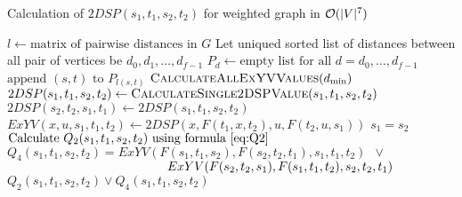 \begin{algorithm}
\caption{Calculation of $2DSP(s_1, t_1, s_2, t_2)$ for weighted graph in $\mathcal{O}(|V|^7)$} \label{alg:n7w}
\begin{algorithmic}[1]
\State $l \gets \text{matrix of pairwise distances in }G$
\State Let uniqued sorted list of distances between all pair of vertices be $d_0, d_1, \ldots, d_{f-1}$
\State $P_d \gets \text{empty list for all }d = d_0, \ldots, d_{f-1}$
    \State $\text{append }(s, t)\text{ to }P_{l(s, t)}$
\EndFor
{}
    \State $\textsc{CalculateAllExYVValues}(d_{\min})$
                \State $2DSP(s_1, t_1, s_2, t_2) \gets \textsc{CalculateSingle2DSPValue}(s_1, t_1, s_2, t_2)$
                \State $2DSP(s_2, t_2, s_1, t_1) \gets 2DSP(s_1, t_1, s_2, t_2)$ 
            \EndFor
        \EndFor
    \EndFor
\EndFor
\EndProcedure
\Statex
{}
                \State $ExYV(x,u,s_1,t_1,t_2) \gets 2DSP(x, F(t_1,x,t_2), u, F(t_2,u,s_1))$
            \EndFor
        \EndFor
    \EndFor
\EndProcedure
\Statex
{}
    \State \Return $s_1 = s_2$ 
    \State {}
\Else
    \State $\text{Calculate }Q_2(s_1, t_1, s_2, t_2)\text{ using formula \eqref{eq:Q2}}$ 
    \State $Q_4(s_1, t_1, s_2, t_2) = ExYV(F(s_1, t_1, s_2), F(s_2, t_2, t_1), s_1, t_1, t_2)\enspace\vee\enspace$ 
    \Statex $\hspace{4.5cm}ExYV(F(s_2, t_2, s_1), F(s_1, t_1, t_2), s_2, t_2, t_1)$
    \State \Return $Q_2(s_1, t_1, s_2, t_2) \vee Q_4(s_1, t_1, s_2, t_2)$
\EndIf
\EndProcedure
\end{algorithmic}
\end{algorithm}
